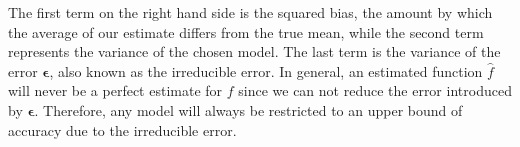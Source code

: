 \begin{comment}
and since the variance of $\boldsymbol{y}$ and $\boldsymbol{\epsilon}$ are both equal to $\sigma^2$, we can use the relations $E[\boldsymbol{y}] = \boldsymbol{f}$, $ E[\boldsymbol{\epsilon}] = 0 $ and $Var(\boldsymbol{y}) = Var(\boldsymbol{\epsilon}) = \sigma_{\epsilon}^2$. The mean value of $\boldsymbol{\epsilon}$ is by definition equal to zero. In addition, the function $\boldsymbol{f}$ is not a stochastic variable, and the same argument can also be used for $\boldsymbol{\hat{y}}$. This allows us to insert the expression $\boldsymbol{y}$ into the cost function
\begin{align*}
E[(\boldsymbol{y-\hat{y}})^2] &= E[(\boldsymbol{f + \epsilon - \hat{y}})^2].
\end{align*}
By using the infamous trick of both adding and subtracting simultaneously, we arrive at
\begin{align*}
E\left[(\boldsymbol{y}-\boldsymbol{\hat{y}})^2\right] &= E[(\boldsymbol{f + \epsilon - \hat{y}} + E[\boldsymbol{y}] - E[\boldsymbol{y}])^2 ].
\end{align*}

And simply by using the relations mentioned above concerning the expectation value for $\boldsymbol{y}$ and the variances for both $\boldsymbol{y}$ and $\epsilon$, the cost function can be rewritten to:

\begin{align*}
E\left[(\boldsymbol{y}-\boldsymbol{\hat{y}})^2\right] &=  E[(\boldsymbol{f}-E[\boldsymbol{\hat{y}}])^2] + Var(\boldsymbol{\hat{y}}) + \sigma_{\epsilon}^2 \\
 &= \frac{1}{n}\sum_i(f_i- E\left[\boldsymbol{\hat{y}}\right])^2+\frac{1}{n}\sum_i(\hat{y}_i- E\left[\boldsymbol{\hat{y}}\right])^2+\sigma^2_{\epsilon}.
\end{align*}

\end{comment}
The first term on the right hand side is the squared bias, the amount by which the average of our estimate differs from the true mean, while the second term represents the variance of the chosen model. The last term is the variance of the error $\boldsymbol{\epsilon}$, also known as the irreducible error. In general, an estimated function $\hat{f}$ will never be a perfect estimate for $f$ since we can not reduce the error introduced by $\boldsymbol{\epsilon}$. Therefore, any model will always be restricted to an upper bound of accuracy due to the irreducible error.



